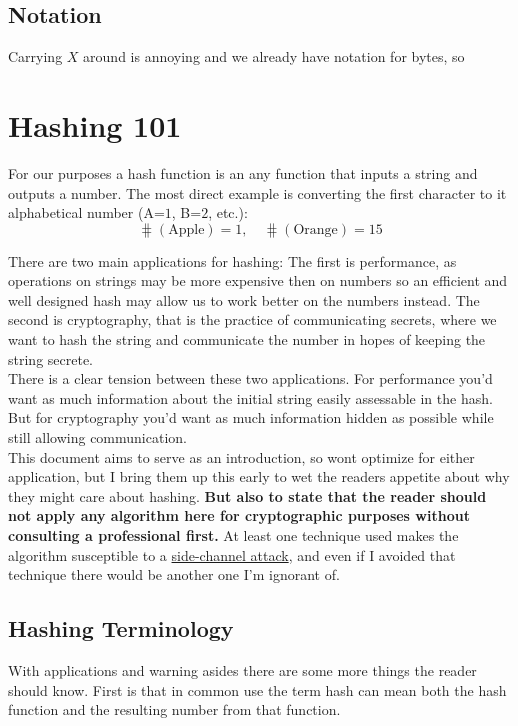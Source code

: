 \subsection{Notation}
Carrying $X$ around is annoying and we already have notation for bytes, so 

\section{Hashing 101}
For our purposes a hash function is an any function that inputs a string and outputs a number.
The most direct example is converting the first character to it alphabetical number (A=$1$, B=$2$, etc.):
\[\hash(\text{Apple}) = 1,\quad \hash(\text{Orange}) = 15\]

There are two main applications for hashing:
The first is performance,
as operations on strings may be more expensive then on numbers so an efficient and well designed hash may allow us to work better on the numbers instead. 
The second is cryptography,
that is the practice of communicating secrets,
where we want to hash the string and communicate the number in hopes of keeping the string secrete.
\\

There is a clear tension between these two applications.
For performance you'd want as much information about the initial string easily assessable in the hash.
But for cryptography you'd want as much information hidden as possible while still allowing communication. 
\\

This document aims to serve as an introduction,
so wont optimize for either application,
but I bring them up this early to wet the readers appetite about why they might care about hashing.
{\textbf{ But also to state that the reader should not apply any algorithm here for cryptographic purposes without consulting a professional first.}}
At least one technique used makes the algorithm susceptible to a \hyperref[appx:side-channel]{side-channel attack},
and even if I avoided that technique there would be another one I'm ignorant of.

\subsection{Hashing Terminology}
With applications and warning asides there are some more things the reader should know.
First is that in common use the term hash can mean both the hash function and the resulting number from that function.

